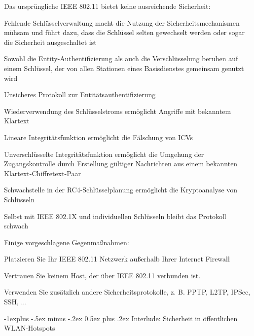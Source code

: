 \documentclass[a4paper]{article}
\makeatletter
\renewcommand{\subsection}{\@startsection{subsection}{2}{0mm}%
 {-1explus -.5ex minus -.2ex}%
 {0.5ex plus .2ex}%
 {\normalfont\normalsize\bfseries}}
\makeatother
\begin{document}
\begin{multicols}{3}
      \begin{itemize*}
            \item Das ursprüngliche IEEE 802.11 bietet keine ausreichende Sicherheit:
            \begin{itemize*}
                  \item Fehlende Schlüsselverwaltung macht die Nutzung der Sicherheitsmechanismen mühsam und führt dazu, dass die Schlüssel selten gewechselt werden oder sogar die Sicherheit ausgeschaltet ist
                  \item Sowohl die Entity-Authentifizierung als auch die Verschlüsselung beruhen auf einem Schlüssel, der von allen Stationen eines Basisdienstes gemeinsam genutzt wird
                  \item Unsicheres Protokoll zur Entitätsauthentifizierung
                  \item Wiederverwendung des Schlüsselstroms ermöglicht Angriffe mit bekanntem Klartext
                  \item Lineare Integritätsfunktion ermöglicht die Fälschung von ICVs
                  \item Unverschlüsselte Integritätsfunktion ermöglicht die Umgehung der Zugangskontrolle durch Erstellung gültiger Nachrichten aus einem bekannten Klartext-Chiffretext-Paar
                  \item Schwachstelle in der RC4-Schlüsselplanung ermöglicht die Kryptoanalyse von Schlüsseln
            \end{itemize*}
            \item Selbst mit IEEE 802.1X und individuellen Schlüsseln bleibt das
            Protokoll schwach
            \item Einige vorgeschlagene Gegenmaßnahmen:
            \begin{itemize*}
                  \item Platzieren Sie Ihr IEEE 802.11 Netzwerk außerhalb Ihrer Internet Firewall
                  \item Vertrauen Sie keinem Host, der über IEEE 802.11 verbunden ist.
                  \item Verwenden Sie zusätzlich andere Sicherheitsprotokolle, z. B. PPTP, L2TP, IPSec, SSH, ...
            \end{itemize*}
      \end{itemize*}


      \subsection{Interlude: Sicherheit in öffentlichen
            WLAN-Hotspots}


\end{multicols}
\end{document}
